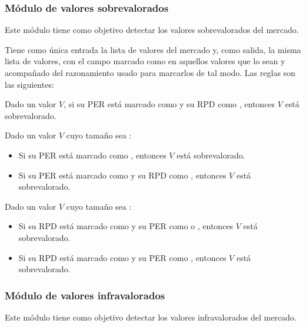 \documentclass[a4paper, 11pt, titlepage]{article}
\begin{document}
    \subsubsection{Módulo de valores sobrevalorados}

    Este módulo tiene como objetivo detectar los valores sobrevalorados del mercado.

    Tiene como única entrada la lista de valores del mercado y, como salida, la misma lista de valores, con el campo  marcado como  en aquellos valores que lo sean y acompañado del razonamiento usado para marcarlos de tal modo. Las reglas son las siguientes:

    \begin{regla}
        Dado un valor $V$, si su PER está marcado como  y su RPD como , entonces $V$ está sobrevalorado.
    \end{regla}

    \begin{regla}
        Dado un valor $V$ cuyo tamaño sea :
        \begin{itemize}
            \item Si su PER está marcado como , entonces $V$ está sobrevalorado.
            \item Si su PER está marcado como  y su RPD como , entonces $V$ está sobrevalorado.
        \end{itemize}
    \end{regla}

    \begin{regla}
        Dado un valor $V$ cuyo tamaño sea :
        \begin{itemize}
            \item Si su RPD está marcado como  y su PER como  o , entonces $V$ está sobrevalorado.
            \item Si su RPD está marcado como  y su PER como , entonces $V$ está sobrevalorado.
        \end{itemize}
    \end{regla}

    \subsubsection{Módulo de valores infravalorados}

    Este módulo tiene como objetivo detectar los valores infravalorados del mercado.
\end{document}
